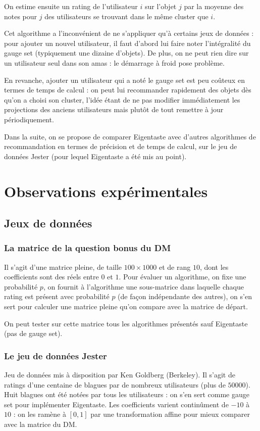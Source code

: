 \documentclass[11pt, openany, a4paper]{article}
\begin{document}
		On estime ensuite un rating de l'utilisateur $i$ sur l'objet $j$ par la moyenne des notes pour $j$ des utilisateurs se trouvant dans le même cluster que $i$.
		
		\medskip
						
		Cet algorithme a l'inconvénient de ne s'appliquer qu'à certains jeux de données : pour ajouter un nouvel utilisateur, il faut d'abord lui faire noter l'intégralité du gauge set (typiquement une dizaine d'objets). De plus, on ne peut rien dire sur un utilisateur seul dans son amas : le démarrage à froid pose problème.
		
		En revanche, ajouter un utilisateur qui a noté le gauge set est peu coûteux en termes de temps de calcul : on peut lui recommander rapidement des objets dès qu'on a choisi son cluster, l'idée étant de ne pas modifier immédiatement les projections des anciens utilisateurs mais plutôt de tout remettre à jour périodiquement.
		
		Dans la suite, on se propose de comparer Eigentaste avec d'autres algorithmes de recommandation en termes de précision et de temps de calcul, sur le jeu de données Jester (pour lequel Eigentaste a été mis au point).
		
		
		
		
\section{Observations expérimentales}
	\subsection{Jeux de données}
	\subsubsection{La matrice de la question bonus du DM}
		
		Il s'agit d'une matrice pleine, de taille $100 \times 1000$ et de rang $10$, dont les coefficients sont des réels entre $0$ et $1$. Pour évaluer un algorithme, on fixe une probabilité $p$, on fournit à l'algorithme une sous-matrice dans laquelle chaque rating est présent avec probabilité $p$ (de façon indépendante des autres), on s'en sert pour calculer une matrice pleine qu'on compare avec la matrice de départ.
		
		On peut tester sur cette matrice tous les algorithmes présentés sauf Eigentaste (pas de gauge set).
		
	\subsubsection{Le jeu de données Jester}
		Jeu de données mis à disposition par Ken Goldberg (Berkeley). Il s'agit de ratings d'une centaine de blagues par de nombreux utilisateurs (plus de $50 000$). Huit blagues ont été notées par tous les utilisateurs : on s'en sert comme gauge set pour implémenter Eigentaste. Les coefficients varient continûment de $-10$ à $10$ : on les ramène à $[0,1]$ par une transformation affine pour mieux comparer avec la matrice du DM.
		
\end{document}
